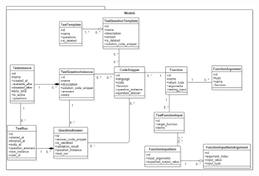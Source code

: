 \documentclass{article}
\begin{document}
    \includegraphics[width=\textwidth, keepaspectratio, center]{ClassDiagram_Models}
\end{document}
